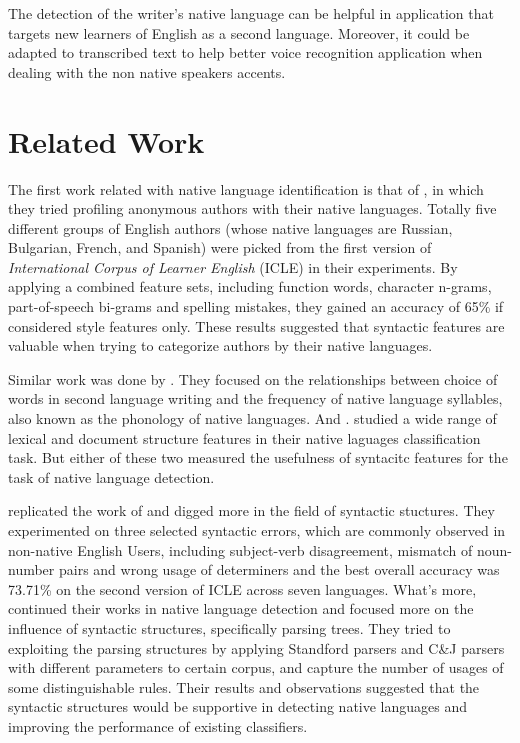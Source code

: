 \documentclass[11pt]{article}
\begin{document}
The detection of the writer's native language can be helpful in application that targets new learners of English as a second language. Moreover, it could be adapted to transcribed text to help better voice recognition application when dealing with the non native speakers accents.



\section{Related Work}

The first work related with native language identification is that of , in which they tried profiling anonymous authors with their native languages. Totally five different groups of English authors (whose native languages are Russian, Bulgarian, French, and Spanish) were picked from the first version of {\em International Corpus of Learner English} (ICLE) in their experiments. By applying a combined feature sets, including function words, character n-grams, part-of-speech bi-grams and spelling mistakes, they gained an accuracy of 65\% if considered style features only. These results suggested that syntactic features are valuable when trying to categorize authors by their native languages.  

Similar work was done by . They focused on the relationships between choice of words in second language writing and the frequency of native language syllables, also known as the phonology of native languages. And . studied a wide range of lexical and document structure features in their native laguages classification task. But either of these two measured the usefulness of syntacitc features for the task of native language detection.

 replicated the work of  and digged more in the field of syntactic stuctures. They experimented on three selected syntactic errors, which are commonly observed in non-native English Users, including subject-verb disagreement, mismatch of noun-number pairs and wrong usage of determiners and the best overall accuracy was 73.71\% on the second version of ICLE across seven languages. What's more,  continued their works in native language detection and focused more on the influence of syntactic structures, specifically parsing trees. They tried to exploiting the parsing structures by applying Standford parsers and C\&J parsers with different parameters to certain corpus, and capture the number of usages of some distinguishable rules. Their results and observations suggested that the syntactic structures would be supportive in detecting native languages and improving the performance of existing classifiers.
\end{document}
